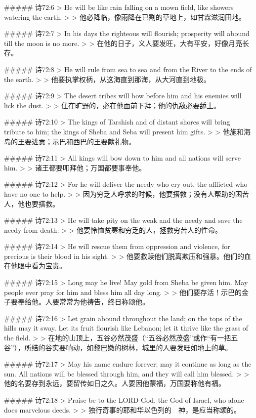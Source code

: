 ##### 诗72:6
> He will be like rain falling on a mown field, like showers watering the earth.
>
> 他必降临，像雨降在已割的草地上，如甘霖滋润田地。


##### 诗72:7
> In his days the righteous will flourish; prosperity will abound till the moon is no more.
>
> 在他的日子，义人要发旺，大有平安，好像月亮长存。


##### 诗72:8
> He will rule from sea to sea and from the River to the ends of the earth.
>
> 他要执掌权柄，从这海直到那海，从大河直到地极。


##### 诗72:9
> The desert tribes will bow before him and his enemies will lick the dust.
>
> 住在旷野的，必在他面前下拜；他的仇敌必要舔土。


##### 诗72:10
> The kings of Tarshish and of distant shores will bring tribute to him; the kings of Sheba and Seba will present him gifts.
>
> 他施和海岛的王要进贡；示巴和西巴的王要献礼物。


##### 诗72:11
> All kings will bow down to him and all nations will serve him.
>
> 诸王都要叩拜他；万国都要事奉他。


##### 诗72:12
> For he will deliver the needy who cry out, the afflicted who have no one to help.
>
> 因为穷乏人呼求的时候，他要搭救；没有人帮助的困苦人，他也要搭救。


##### 诗72:13
> He will take pity on the weak and the needy and save the needy from death.
>
> 他要怜恤贫寒和穷乏的人，拯救穷苦人的性命。


##### 诗72:14
> He will rescue them from oppression and violence, for precious is their blood in his sight.
>
> 他要救赎他们脱离欺压和强暴。他们的血在他眼中看为宝贵。


##### 诗72:15
> Long may he live! May gold from Sheba be given him. May people ever pray for him and bless him all day long.
>
> 他们要存活！示巴的金子要奉给他。人要常常为他祷告，终日称颂他。


##### 诗72:16
> Let grain abound throughout the land; on the tops of the hills may it sway. Let its fruit flourish like Lebanon; let it thrive like the grass of the field.
>
> 在地的山顶上，五谷必然茂盛（“五谷必然茂盛”或作“有一把五谷”），所结的谷实要响动，如黎巴嫩的树林，城里的人要发旺如地上的草。


##### 诗72:17
> May his name endure forever; may it continue as long as the sun. All nations will be blessed through him, and they will call him blessed.
>
> 他的名要存到永远，要留传如日之久。人要因他蒙福，万国要称他有福。


##### 诗72:18
> Praise be to the LORD God, the God of Israel, who alone does marvelous deeds.
>
> 独行奇事的耶和华以色列的　神，是应当称颂的。


